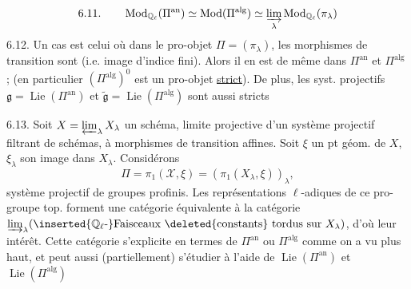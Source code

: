 \[
6.11.\qquad \operatorname{Mod}_{\mathbb{Q}_\ell}(\Pi^{\mathrm{an}})\simeq
\operatorname{Mod}(\Pi^{\mathrm{alg}})\simeq
\varinjlim_\lambda\operatorname{Mod}_{\mathbb{Q}_\ell}(\pi_\lambda)
\]
6.12. Un cas  est celui où dans le 
pro-objet $\Pi=(\pi_\lambda)$, les morphismes de transition sont
 (i.e. image d'indice fini). Alors il en est de même
dans $\Pi^{\mathrm{an}}$ et $\Pi^{\mathrm{alg}}$ ; (en particulier
$(\Pi^{\mathrm{alg}})^0$ est un pro-objet \uline{strict}). De plus, les syst.
projectifs $\mathfrak{g}=\operatorname{Lie}(\Pi^{\mathrm{an}})$ et
$\widetilde{\mathfrak{g}}=\operatorname{Lie}(\Pi^{\mathrm{alg}})$ sont aussi
stricts \unsure{\ldots}

6.13. Soit $X=\varprojlim_\lambda X_\lambda$ un schéma, limite projective
d'un système projectif filtrant 
de schémas, à morphismes de transition affines. Soit $\xi$ un pt géom.
de $X$, $\xi_\lambda$ son image dans $X_\lambda$. Considérons
\[
\Pi=\pi_1(\mathscr{X},\xi)=(\pi_1(X_\lambda,\xi))_\lambda,
\]
système projectif de groupes profinis. Les représentations
$\ell$-adiques de ce  pro-groupe top. forment une
catégorie équivalente à la catégorie
$\varinjlim_\lambda(\inserted{\mathbb{Q}_\ell\text{-}}\text{Faisceaux
\deleted{constants} tordus sur }X_\lambda)$, d'où leur intérêt. Cette
catégorie s'explicite en termes de $\Pi^{\mathrm{an}}$ ou $\Pi^{\mathrm{alg}}$
comme on a vu plus haut, et peut aussi (partiellement) s'étudier à l'aide
de $\operatorname{Lie}(\Pi^{\mathrm{an}})$ et
$\operatorname{Lie}(\Pi^{\mathrm{alg}})$
